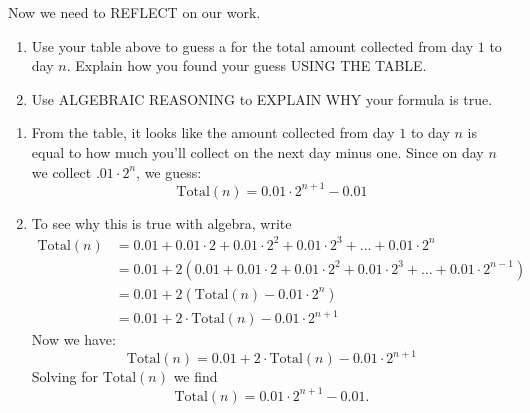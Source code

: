 \documentclass[nooutcomes,noauthor,hints]{ximera}
\begin{document}
\begin{question}
  Now we need to REFLECT on our work.
  \begin{enumerate}
    \item Use your table above to guess a for the total amount
      collected from day $1$ to day $n$. Explain how you found your
      guess USING THE TABLE.
    \item Use ALGEBRAIC REASONING to EXPLAIN WHY your formula is true.
  \end{enumerate}
  \begin{freeResponse}
    \begin{enumerate}
      \item From the table, it looks like the amount collected from
        day $1$ to day $n$ is equal to how much you'll collect on the
        next day minus one. Since on day $n$ we collect $.01\cdot
        2^n$, we guess:
        \[
        \mathrm{Total}(n) = 0.01\cdot 2^{n+1} -0.01
        \]
      \item To see why this is true with algebra, write
        \begin{align*}
        \mathrm{Total}(n) &= 0.01 +0.01\cdot 2+0.01\cdot 2^2 +0.01 \cdot 2^3 + \dots + 0.01 \cdot 2^n\\
        &= 0.01 + 2 ( 0.01 +0.01\cdot 2+0.01\cdot 2^2 +0.01 \cdot 2^3 + \dots + 0.01 \cdot 2^{n-1})\\
        &= 0.01 + 2 ( \mathrm{Total}(n) - 0.01\cdot 2^n)\\
        &= 0.01 + 2\cdot\mathrm{Total}(n) - 0.01\cdot 2^{n+1}
        \end{align*}
    Now we have:
    \[
    \mathrm{Total}(n)= 0.01 + 2\cdot\mathrm{Total}(n) - 0.01\cdot 2^{n+1}
    \]
    Solving for $\mathrm{Total}(n)$ we find
    \[
    \mathrm{Total}(n) = 0.01\cdot 2^{n+1} -0.01.
    \]
    \end{enumerate}
  \end{freeResponse}
\end{question}
\end{document}
